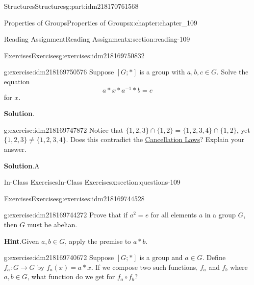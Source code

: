 \documentclass[oneside,10pt,]{book}
\newcommand{\blocktitlefont}{\relax}
\numberwithin{equation}{section}
\begin{document}
\begin{partptx}{Structures}{}{Structures}{}{}{g:part:idm218170761568}
\begin{chapterptx}{Properties of Groups}{}{Properties of Groups}{}{}{x:chapter:chapter_109}
\begin{sectionptx}{Reading Assignment}{}{Reading Assignment}{}{}{x:section:reading-109}
\begin{exercises-subsection-numberless}{Exercises}{}{Exercises}{}{}{g:exercises:idm218169750832}
\begin{exercisegroup}
\begin{divisionexerciseeg}{1}{}{}{g:exercise:idm218169750576}
Suppose \([G;*]\) is a group with \(a,b,c \in G\).   Solve the equation%
\begin{equation*}
a*x*a^{-1}*b= c
\end{equation*}
for \(x\).%
\par\smallskip%
\noindent\textbf{\blocktitlefont Solution}.\hypertarget{g:solution:idm218169748128}{}\quad{}%
\end{divisionexerciseeg}%
\begin{divisionexerciseeg}{2}{}{}{g:exercise:idm218169747872}%
Notice that \(\{1,2,3\} \cap \{1,2\} = \{1,2,3,4\} \cap \{1,2\}\), yet \(\{1,2,3\}  \neq \{1,2,3,4\} \). Does this contradict the \hyperref[x:theorem:theorem-11-3-cancellation]{Cancellation Laws}? Explain your answer.%
\par\smallskip%
\noindent\textbf{\blocktitlefont Solution}.\hypertarget{g:solution:idm218169745744}{}\quad{}A%
\end{divisionexerciseeg}%
\end{exercisegroup}
\par\medskip\noindent
\end{exercises-subsection-numberless}
\end{sectionptx}
%
%
\typeout{************************************************}
\typeout{************************************************}
%
\begin{sectionptx}{In-Class Exercises}{}{In-Class Exercises}{}{}{x:section:questions-109}
%
%
%
\typeout{************************************************}
\typeout{************************************************}
%
\begin{exercises-subsection-numberless}{Exercises}{}{Exercises}{}{}{g:exercises:idm218169744528}
\par\medskip\noindent%
%
\begin{exercisegroup}
\begin{divisionexerciseeg}{1}{}{}{g:exercise:idm218169744272}%
Prove that if \(a^2 = e\) for all elements \(a\) in a group \(G\), then \(G\) must be abelian.%
\par\smallskip%
\noindent\textbf{\blocktitlefont Hint}.\hypertarget{g:hint:idm218169741904}{}\quad{}Given \(a, b \in G\), apply the premise to \(a*b\).%
\end{divisionexerciseeg}%
\begin{divisionexerciseeg}{2}{}{}{g:exercise:idm218169740672}%
Suppose \([G;*]\) is a group and \(a \in G\).  Define \(f_a:G \to  G\) by \(f_a(x) = a * x\).  If we compose two such functions, \(f_a\) and \(f_b\) where \(a, b \in G\), what function do we get for \(f_a \circ f_b\)?%

\end{divisionexerciseeg}
\end{exercisegroup}
\end{exercises-subsection-numberless}
\end{sectionptx}
\end{chapterptx}
\end{partptx}
\end{document}
